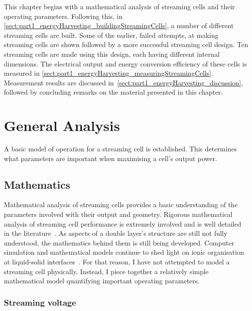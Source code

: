 
This chapter begins with a mathematical analysis of streaming cells and their operating parameters.
Following this, in \cref{sect:part1_energyHarvesting_buildingStreamingCells}, a number of different streaming cells are built.
Some of the earlier, failed attempts, at making streaming cells are shown followed by a more successful streaming cell design.
Ten streaming cells are made using this design, each having different internal dimensions.
The electrical output and energy conversion efficiency of these cells is measured in \cref{sect:part1_energyHarvesting_measuringStreamingCells}.
Measurement results are discussed in~\cref{sect:part1_energyHarvesting_discussion}, followed by concluding remarks on the material presented in this chapter.


\section{General Analysis}
  \label{sect:part1_energyHarvesting_generalAnalysis}


  A basic model of operation for a streaming cell is established.
  This determines what parameters are important when maximising a cell's output power.


  \subsection{Mathematics}


    Mathematical analysis of streaming cells provides a basic understanding of the parameters involved with their output and geometry.
    Rigorous mathematical analysis of streaming cell performance is extremely involved and is well detailed in the literature~\cite{Yang1998}.
    As aspects of a double layer's structure are still not fully understood, the mathematics behind them is still being developed.
    Computer simulation and mathematical models continue to shed light on ionic organisation at liquid-solid interfaces~\cite{Kornyshev2007}.
    For that reason, I have not attempted to model a streaming cell physically.
    Instead, I piece together a relatively simple mathematical model quantifying important operating parameters.


    \subsubsection*{Streaming voltage}

